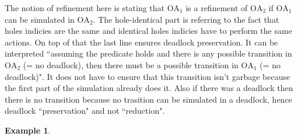 \documentclass{article}
\theoremstyle{plain}
\theoremstyle{definition}
\newtheorem{exi}{Example}
\begin{document}
The notion of refinement here is stating that \(\mathrm{OA}_1\) is a refinement of \(\mathrm{OA}_2\) if \(\mathrm{OA}_1\) can be simulated in \(\mathrm{OA}_2\).
The hole-identical part is referring to the fact that holes indicies are the same and identical holes indicies have to perform the same actions.
On top of that the last line ensures deadlock preservation.
It can be interpreted ``assuming the predicate holds and there is any possible transition in \(\mathrm{OA}_2\) (= no deadlock), then there must be a possible transition in \(\mathrm{OA}_1\) (= no deadlock)".
It does not have to ensure that this transition isn't garbage because the first part of the simulation already does it.
Also if there was a deadlock then there is no transition because no trasition can be simulated in a deadlock, hence deadlock ``preservation" and not ``reduction".

\begin{exi} %
\end{exi}
\end{document}
